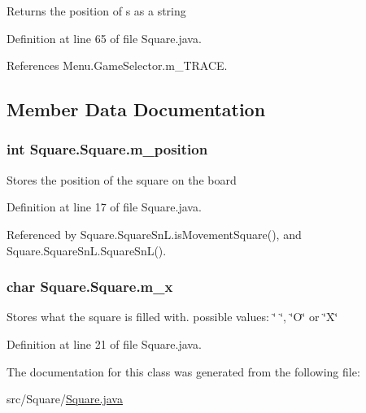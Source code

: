 \begin{DoxyReturn}{Returns}
the position of s as a string 
\end{DoxyReturn}


Definition at line 65 of file Square.\+java.



References Menu.\+Game\+Selector.\+m\+\_\+\+T\+R\+A\+C\+E.



\subsection{Member Data Documentation}
\hypertarget{class_square_1_1_square_a459ef3208bfff1bc1a693a335c2cd5e5}{}
\subsubsection[{m\+\_\+position}]{\setlength{\rightskip}{0pt plus 5cm}int Square.\+Square.\+m\+\_\+position\hspace{0.3cm}{\ttfamily [protected]}}\label{class_square_1_1_square_a459ef3208bfff1bc1a693a335c2cd5e5}
Stores the position of the square on the board 

Definition at line 17 of file Square.\+java.



Referenced by Square.\+Square\+Sn\+L.\+is\+Movement\+Square(), and Square.\+Square\+Sn\+L.\+Square\+Sn\+L().

\hypertarget{class_square_1_1_square_a9e0779af7f8cbe54b28f95bb4a5d165a}{}
\subsubsection[{m\+\_\+x}]{\setlength{\rightskip}{0pt plus 5cm}char Square.\+Square.\+m\+\_\+x\hspace{0.3cm}{\ttfamily [protected]}}\label{class_square_1_1_square_a9e0779af7f8cbe54b28f95bb4a5d165a}
Stores what the square is filled with. possible values\+: \char`\"{} \char`\"{}, \char`\"{}\+O\char`\"{} or \char`\"{}\+X\char`\"{} 

Definition at line 21 of file Square.\+java.



The documentation for this class was generated from the following file\+:\begin{DoxyCompactItemize}
\item 
src/\+Square/\hyperlink{_square_8java}{Square.\+java}\end{DoxyCompactItemize}
